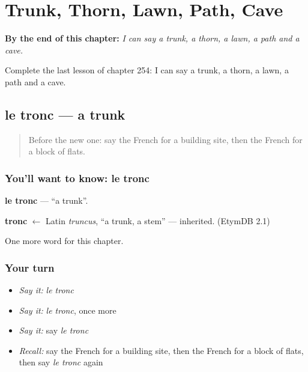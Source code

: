 
\chapter{Trunk, Thorn, Lawn, Path, Cave}
\label{ch:fr-trunk-thorn-lawn-path-cave}

\begin{chapteropening}
\textbf{By the end of this chapter:} \emph{I can say a trunk, a thorn, a lawn, a path and a cave.}

Complete the last lesson of chapter 254: I can say a trunk, a thorn, a lawn, a path and a cave.
\end{chapteropening}

\section[le tronc]{le tronc — a trunk}

\label{lesson:FR-C254-tronc}



\begin{quote}
Before the new one: say the French for a building site, then the French for a block of flats.
\end{quote}

\subsection*{You'll want to know: le tronc}
\textbf{le tronc} — \textquotedblleft{}a trunk\textquotedblright{}.

\begin{cousinweb}
\textbf{tronc} $\leftarrow$ Latin \emph{truncus}, \textquotedblleft{}a trunk, a stem\textquotedblright{} — inherited. (EtymDB 2.1)
\end{cousinweb}

\begin{grammarlens}[title={What you've built}]
One more word for this chapter.
\end{grammarlens}

\subsection*{Your turn}
\begin{itemize}
\raggedright
  \item \emph{Say it:} \emph{le tronc}
  \item \emph{Say it:} \emph{le tronc}, once more
  \item \emph{Say it:} say \emph{le tronc}
  \item \emph{Recall:} say the French for a building site, then the French for a block of flats, then say \emph{le tronc} again
\end{itemize}

